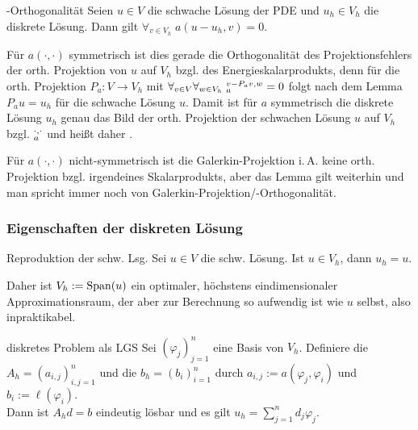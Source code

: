 \linie

\begin{Lemma}{-Orthogonalität}
    Seien $u \in V$ die schwache Lösung der PDE und
    $u_h \in V_h$ die diskrete Lösung.
    Dann gilt $\forall_{v \in V_h}\; a(u - u_h, v) = 0$.
\end{Lemma}

\begin{Bem}
    Für $a(\cdot, \cdot)$ symmetrisch ist dies gerade die Orthogonalität des
    Projektionsfehlers der orth. Projektion von $u$ auf $V_h$ bzgl. des Energieskalarprodukts,
    denn für die orth. Projektion $P_a\colon V \to V_h$ mit
    $\forall_{v \in V} \forall_{w \in V_h}\; \sp{v - P_a v, w}_a = 0$
    folgt nach dem Lemma $P_a u = u_h$ für die schwache Lösung $u$.
    Damit ist für $a$ symmetrisch die diskrete Lösung $u_h$ genau das Bild der
    orth. Projektion der schwachen Lösung $u$ auf $V_h$ bzgl. $\sp{\cdot, \cdot}_a$
    und heißt daher .
    
    Für $a(\cdot, \cdot)$ nicht-symmetrisch ist die Galerkin-Projektion i.\,A.
    keine orth. Projektion bzgl. irgendeines Skalarprodukts,
    aber das Lemma gilt weiterhin und man spricht immer noch von
    Galerkin-Projektion/-Orthogonalität.
\end{Bem}

\subsubsection{%
    Eigenschaften der diskreten Lösung%
}

\begin{Lemma}{Reproduktion der schw. Lsg.}
    Sei $u \in V$ die schw. Lösung.
    Ist $u \in V_h$, dann $u_h = u$.
\end{Lemma}

\begin{Bem}
    Daher ist $V_h := \operatorname{Span}(u)$ ein optimaler, höchstens eindimensionaler Approximationsraum,
    der aber zur Berechnung so aufwendig ist wie $u$ selbst, also inpraktikabel.
\end{Bem}

\linie

\begin{Satz}{diskretes Problem als LGS}
    Sei $(\varphi_j)_{j=1}^n$ eine Basis von $V_h$.
    Definiere die  $A_h = (a_{i,j})_{i,j=1}^n$
    und die  $b_h = (b_i)_{i=1}^n$ durch
    $a_{i,j} := a(\varphi_j, \varphi_i)$ und $b_i := \ell(\varphi_i)$.\\
    Dann ist $A_h d = b$ eindeutig lösbar und es gilt $u_h = \sum_{j=1}^n d_j \varphi_j$.
\end{Satz}

